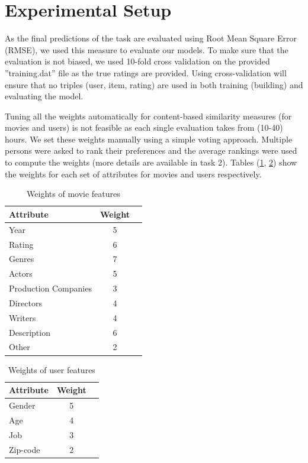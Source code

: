 \documentclass{sigish}
\begin{document}
\section{Experimental Setup}

As the final predictions of the task are evaluated using Root Mean Square Error (RMSE), we used this measure to evaluate our models. To make sure that the evaluation is not biased, we used 10-fold cross validation on the provided ''training.dat'' file as the true ratings are provided. Using cross-validation will ensure that no triples (user, item, rating) are used in both training (building) and evaluating the model.

Tuning all the weights automatically for content-based similarity measures (for movies and users) is not feasible as each single evaluation takes from (10-40) hours. We set these weights manually using a simple voting approach. Multiple persons were asked to rank their preferences and the average rankings were used to compute the weights (more details are available in task 2). Tables (\ref{tab:movie_weights}, \ref{tab:user_weights}) show the weights for each set of attributes for movies and users respectively.

\begin{table}[]
\centering
\begin{tabular}{|l|c|c|}
\hline
\textbf{Attribute} & \textbf{Weight} \\ \hline
Year             & 5               \\ \hline
Rating             & 6               \\ \hline
Genres             & 7               \\ \hline
Actors             & 5               \\ \hline
Production Companies             & 3               \\ \hline
Directors             & 4               \\ \hline
Writers             & 4               \\ \hline
Description             & 6               \\ \hline
Other             & 2               \\ \hline  
\end{tabular}
\caption{Weights of movie features}
\label{tab:movie_weights}
\end{table}

\begin{table}[]
	\centering
	\begin{tabular}{|l|c|c|}
		\hline
		\textbf{Attribute} & \textbf{Weight} \\ \hline
		Gender             & 5               \\ \hline
		Age             & 4               \\ \hline
		Job             & 3               \\ \hline
		Zip-code             & 2               \\ \hline
	\end{tabular}
	\caption{Weights of user features}
	\label{tab:user_weights}
\end{table}
\end{document}
